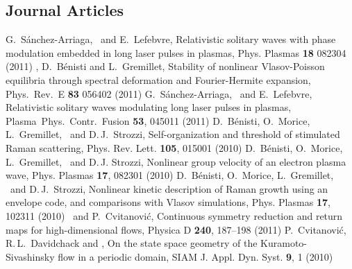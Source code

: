 \subsection{Journal Articles}
	{G.~S\'anchez-Arriaga, \siminos\ and E.~Lefebvre,
	{\emtitle Relativistic solitary waves with phase modulation embedded in long laser pulses in plasmas,}
	{\emjournal Phys. Plasmas} \textbf{18} 082304 (2011) %
	}
	{\siminos, D.~B\'enisti and L.~Gremillet,
	{\emtitle Stability of nonlinear Vlasov-Poisson equilibria through spectral deformation and Fourier-Hermite expansion,}
	{\emjournal Phys.~Rev.~E} \textbf{83} 056402 (2011) %
	}
	{G.~S\'anchez-Arriaga, \siminos\ and E.~Lefebvre,
	{\emtitle Relativistic solitary waves modulating long laser pulses in plasmas,}
	{\emjournal Plasma~Phys.~Contr.~Fusion} \textbf{53}, 045011 (2011)%
	}
	{D.~B\'enisti, O.~Morice, L.~Gremillet, \siminos\ and D.\,J.~Strozzi,
	{\emtitle Self-organization and threshold of stimulated Raman scattering,}
	{\emjournal Phys. Rev. Lett.} \textbf{105}, 015001 (2010)
	}
	{D.~B\'enisti, O.~Morice, L.~Gremillet, \siminos\ and D.\,J. Strozzi,
	{\emtitle Nonlinear group velocity of an electron plasma wave,}
	{\emjournal Phys. Plasmas} \textbf{17}, 082301 (2010)
	}
	{D.~B\'enisti, O.~Morice, L.~Gremillet, \siminos\ and D.\,J.~Strozzi,
	{\emtitle Nonlinear kinetic description of Raman growth using an envelope code, and comparisons with Vlasov simulations,}
	{\emjournal Phys. Plasmas} \textbf{17}, 102311 (2010)
	}
	{\siminos\ and  P.~Cvitanovi\'c,
 	{\emtitle Continuous symmetry reduction and return maps for high-dimensional flows,}
 	{\emjournal Physica D} \textbf{240}, 187--198 (2011)
	}
	{P.~Cvitanovi\'c, R.\,L.~Davidchack and \siminos,
 	{\emtitle On the state space geometry of the Kuramoto-Sivashinsky flow in a periodic domain,}
 	{\emjournal SIAM J. Appl. Dyn. Syst.} \textbf{9}, 1 (2010)
	}
